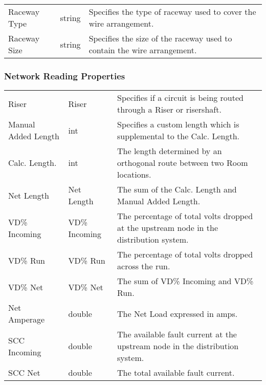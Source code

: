 \documentclass[letterpaper,10pt,english]{sphinxmanual}
\begin{document}
\begin{savenotes}\sphinxattablestart
\centering
\begin{tabulary}{\linewidth}[t]{|T|T|T|}
\hline

&
&
\\
\hline
Raceway Type
&
string
&
Specifies the type of raceway used to cover the wire arrangement.
\\
\hline
Raceway Size
&
string
&
Specifies the size of the raceway used to contain the wire arrangement.
\\
\hline
\end{tabulary}
\par
\sphinxattableend\end{savenotes}


\subsubsection{Network Reading Properties}
\label{\detokenize{docs/definitions/index-definitions:network-reading-properties}}\label{\detokenize{docs/definitions/index-definitions:id6}}

\begin{savenotes}\sphinxattablestart
\centering
\begin{tabulary}{\linewidth}[t]{|T|T|T|}
\hline

&
&
\\
\hline
Riser
&
Riser
&
Specifies if a circuit is being routed through a Riser or risershaft.
\\
\hline
Manual Added Length
&
int
&
Specifies a custom length which is supplemental to the Calc. Length.
\\
\hline
Calc. Length.
&
int
&
The length determined by an orthogonal route between two Room locations.
\\
\hline
Net Length
&
Net Length
&
The sum of the Calc. Length and Manual Added Length.
\\
\hline
VD\% Incoming
&
VD\% Incoming
&
The percentage of total volts dropped at the upstream node in the distribution system.
\\
\hline
VD\% Run
&
VD\% Run
&
The percentage of total volts dropped across the run.
\\
\hline
VD\% Net
&
VD\% Net
&
The sum of VD\% Incoming and VD\% Run.
\\
\hline
Net Amperage
&
double
&
The Net Load expressed in amps.
\\
\hline
SCC Incoming
&
double
&
The available fault current at the upstream node in the distribution system.
\\
\hline
SCC Net
&
double
&
The total available fault current.
\\
\hline
\end{tabulary}
\par
\sphinxattableend\end{savenotes}
\end{document}
